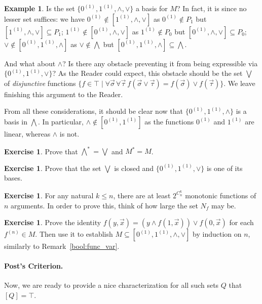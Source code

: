 \documentclass[12pt,notitlepage]{article}
\theoremstyle{plain}
\theoremstyle{definition}
\newtheorem{exc}[thm]{Exercise}
\newtheorem{exm}[thm]{Example}
\theoremstyle{plain}
\newcommand{\sbs}{\subseteq}
\newcommand{\1}{\mathbf{1}}
\newcommand{\0}{\mathbf{0}}
\begin{document}
\begin{exm}
Is the set $\{0^{(1)}, 1^{(1)}, {\wedge},  {\vee}\}$ a basis for $M$? In fact, it is since no lesser set suffices: we have $0^{(1)} \notin [1^{(1)}, {\wedge},  {\vee}]$ as $0^{(1)} \notin P_1$ but $[1^{(1)}, {\wedge},  {\vee}] \sbs P_1$; $1^{(1)} \notin [0^{(1)}, {\wedge},  {\vee}]$ as $1^{(1)} \notin P_0$ but $[0^{(1)}, {\wedge},  {\vee}] \sbs P_0$; ${\vee} \notin [0^{(1)}, 1^{(1)}, {\wedge}]$ as ${\vee} \notin {\bigwedge}$ but $[0^{(1)}, 1^{(1)}, {\wedge}] \sbs {\bigwedge}$.

And what about ${\wedge}$? Is there any obstacle preventing it from being expressible via $\{0^{(1)}, 1^{(1)}, {\vee}\}$? As the Reader could expect, this obstacle should be the set ${\bigvee}$ of \emph{disjunctive} functions $\{ f \in \top \mid \forall \vec \sigma\, \forall \vec \tau\  f(\vec \sigma \vee \vec \tau) = f(\vec \sigma) \vee f(\vec \tau) \}$. We leave finishing this argument to the Reader.

From all these considerations, it should be clear now that $\{0^{(1)}, 1^{(1)}, {\wedge}\}$ is a basis in ${\bigwedge}$. In particular, ${\wedge} \notin [0^{(1)}, 1^{(1)}]$ as the functions $0^{(1)}$ and $1^{(1)}$ are linear, whereas ${\wedge}$ is not.
\end{exm}

\begin{exc}
Prove that ${\bigwedge}^* = {\bigvee}$ and $M^* = M$.
\end{exc}

\begin{exc}
Prove that the set ${\bigvee}$ is closed and $\{0^{(1)}, 1^{(1)}, {\vee}\}$ is one of its bases.
\end{exc}

\begin{exc}
For any natural $k \leq n$, there are at least $2^{C_n^k}$ monotonic functions of $n$ arguments. In order to prove this, think of how large the set $N_f$ may be.
\end{exc}

\begin{exc}
Prove the identity $f(y, \vec x) = (y \wedge f(1, \vec x)) \vee f(0, \vec x)$ for each $f^{(n)} \in M$. Then use it to establish $M \sbs [0^{(1)}, 1^{(1)}, {\wedge},  {\vee}]$ by induction on $n$, similarly to Remark~\ref{bool:func_var}.
\end{exc}


\paragraph{Post's Criterion.} Now, we are ready to provide a nice characterization for all such sets $Q$ that $[Q] = \top$.
\end{document}
